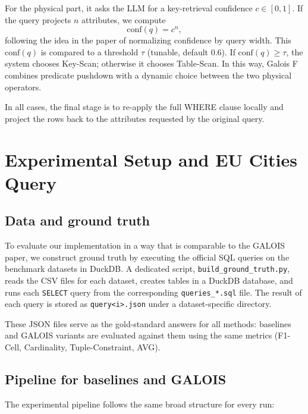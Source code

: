 \documentclass[11pt]{article}
\begin{document}
For the physical part, it asks the LLM for a key-retrieval confidence $c \in [0,1]$.
If the query projects $n$ attributes, we compute
\[
  \mathrm{conf}(q) = c^{n},
\]
following the idea in the paper of normalizing confidence by query width. This
$\mathrm{conf}(q)$ is compared to a threshold $\tau$ (tunable, default $0.6$). If
$\mathrm{conf}(q) \ge \tau$, the system chooses Key-Scan; otherwise it chooses
Table-Scan. In this way, Galois F combines predicate pushdown with a dynamic choice
between the two physical operators.

In all cases, the final stage is to re-apply the full WHERE clause locally and project the
rows back to the attributes requested by the original query.

\section{Experimental Setup and EU Cities Query}
\label{sec:eu_cities_setup}

\subsection{Data and ground truth}

To evaluate our implementation in a way that is comparable to the GALOIS paper, we
construct ground truth by executing the official SQL queries on the benchmark datasets
in DuckDB. A dedicated script, \texttt{build\_ground\_truth.py}, reads the CSV files for
each dataset, creates tables in a DuckDB database, and runs each \texttt{SELECT} query
from the corresponding \texttt{queries\_*.sql} file. The result of each query is stored as
\texttt{query<i>.json} under a dataset-specific directory.

These JSON files serve as the gold-standard answers for all methods: baselines and
GALOIS variants are evaluated against them using the same metrics (F1-Cell, Cardinality,
Tuple-Constraint, AVG).

\subsection{Pipeline for baselines and GALOIS}

The experimental pipeline follows the same broad structure for every run:
\end{document}
